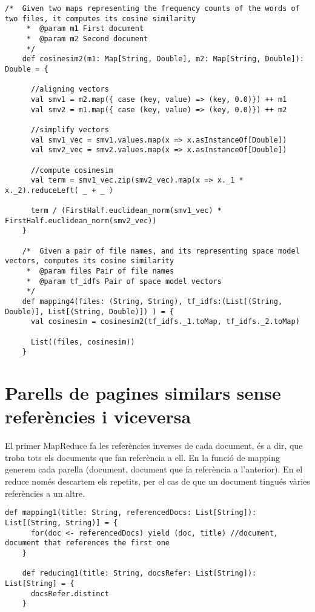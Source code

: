 \documentclass{report}
\begin{document}
\begin{lstlisting}[style=scalaHighlight]
/*  Given two maps representing the frequency counts of the words of two files, it computes its cosine similarity
     *  @param m1 First document
     *  @param m2 Second document
     */
    def cosinesim2(m1: Map[String, Double], m2: Map[String, Double]): Double = {

      //aligning vectors
      val smv1 = m2.map({ case (key, value) => (key, 0.0)}) ++ m1
      val smv2 = m1.map({ case (key, value) => (key, 0.0)}) ++ m2

      //simplify vectors
      val smv1_vec = smv1.values.map(x => x.asInstanceOf[Double])
      val smv2_vec = smv2.values.map(x => x.asInstanceOf[Double])

      //compute cosinesim
      val term = smv1_vec.zip(smv2_vec).map(x => x._1 * x._2).reduceLeft( _ + _ )

      term / (FirstHalf.euclidean_norm(smv1_vec) * FirstHalf.euclidean_norm(smv2_vec))
    }

    /*  Given a pair of file names, and its representing space model vectors, computes its cosine similarity
     *  @param files Pair of file names
     *  @param tf_idfs Pair of space model vectors
     */
    def mapping4(files: (String, String), tf_idfs:(List[(String, Double)], List[(String, Double)]) ) = {
      val cosinesim = cosinesim2(tf_idfs._1.toMap, tf_idfs._2.toMap)

      List((files, cosinesim))
    }
\end{lstlisting}

\newpage

\section{Parells de pagines similars sense referències i viceversa}

El primer MapReduce fa les referències inverses de cada document, és a dir, que troba tots els documents que fan referència a ell.
En la funció de mapping generem cada parella (document, document que fa referència a l'anterior). En el reduce només descartem els repetits, per el cas de que un document tingués vàries referències a un altre.
\begin{lstlisting}[style=scalaHighlight]
    def mapping1(title: String, referencedDocs: List[String]): List[(String, String)] = {
      for(doc <- referencedDocs) yield (doc, title) //document, document that references the first one
    }

    def reducing1(title: String, docsRefer: List[String]): List[String] = {
      docsRefer.distinct
    }
\end{lstlisting}
\end{document}
